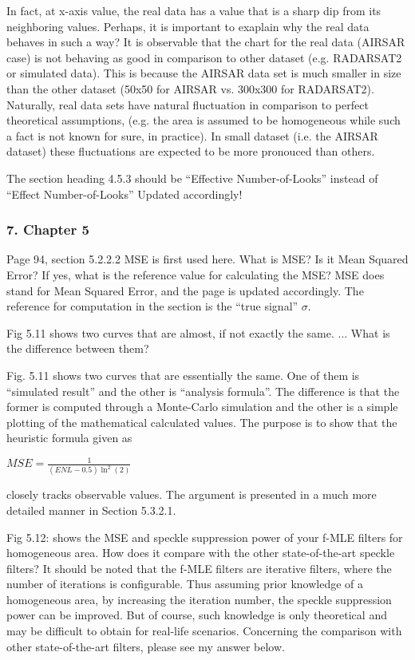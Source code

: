\replyToComment
    {
      In fact, at x-axis value, the real data has a value that is a sharp dip from its neighboring values.
      Perhaps, it is important to exaplain why the real data behaves in such a way?
    }
    {
      It is observable that the chart for the real data (AIRSAR case) is not behaving as good in comparison to other dataset (e.g. RADARSAT2 or simulated data).
      This is because the AIRSAR data set is much smaller in size than the other dataset (50x50 for AIRSAR vs. 300x300 for RADARSAT2).
      Naturally, real data sets have natural fluctuation in comparison to perfect theoretical assumptions, (e.g. the area is assumed to be homogeneous while such a fact is not known for sure, in practice).
      In small dataset (i.e. the AIRSAR dataset) these fluctuations are expected to be more pronouced than others.
    }
    
\replyToComment
    {The section heading 4.5.3 should be ``Effective Number-of-Looks'' instead of ``Effect Number-of-Looks''}
    {Updated accordingly!}

\subsubsection*{7. Chapter 5}

\replyToComment
    {Page 94, section 5.2.2.2 MSE is first used here. What is MSE? Is it Mean Squared Error? If yes, what is the reference value for calculating the MSE?}
    {MSE does stand for Mean Squared Error, and the page is updated accordingly.
The reference for computation in the section is the ``true signal'' $\sigma$.
}

\replyToComment
    {Fig 5.11  shows two curves that are almost, if not exactly the same. ...
What is the difference between them?}
    {Fig. 5.11 shows two curves that are essentially the same.
One of them is ``simulated result'' and the other is ``analysis formula''.
The difference is that the former is computed through a Monte-Carlo simulation and the other is a simple plotting of the mathematical calculated values.
The purpose is to show that the heuristic formula given as

\begin{center}
  $MSE = \frac{1}{(ENL-0.5)\ln^2(2)}$
\end{center}  

closely tracks observable values.
The argument is presented in a much more detailed manner in Section 5.3.2.1.
}

\replyToComment
    {Fig 5.12: shows the MSE and speckle suppression power of your f-MLE filters for homogeneous area. How does it compare with the other state-of-the-art speckle filters?}
    {
      It should be noted that the f-MLE filters are iterative filters, where the number of iterations is configurable.
      Thus assuming prior knowledge of a homogeneous area, by increasing the iteration number, the speckle suppression power can be improved.
      But of course, such knowledge is only theoretical and may be difficult to obtain for real-life scenarios.
      Concerning the comparison with other state-of-the-art filters, please see my answer below.
    }

